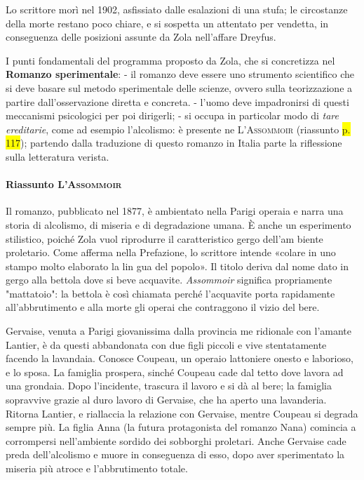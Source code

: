 \documentclass{book}
\newcommand{\pagine}[1]{\colorbox{yellow}{#1}}
\begin{document}
Lo scrittore morì nel 1902, asfissiato dalle esalazioni di una stufa; le
circostanze della morte restano poco chiare, e si sospetta un attentato
per vendetta, in conseguenza delle posizioni assunte da Zola nell'affare
Dreyfus.

I punti fondamentali del programma proposto da Zola, che si concretizza
nel \textbf{Romanzo sperimentale}: - il romanzo deve essere uno
strumento scientifico che si deve basare sul metodo sperimentale delle
scienze, ovvero sulla teorizzazione a partire dall'osservazione diretta
e concreta. - l'uomo deve impadronirsi di questi meccanismi psicologici
per poi dirigerli; - si occupa in particolar modo di \emph{tare
ereditarie}, come ad esempio l'alcolismo: è presente ne
\textsc{L'Assommoir} (riassunto \pagine{p. 117}); partendo dalla
traduzione di questo romanzo in Italia parte la riflessione sulla
letteratura verista.

\paragraph{Riassunto \textsc{L'Assommoir}} Il romanzo, pubblicato nel 1877, è ambientato nella Parigi operaia e narra una storia di alcolismo, di miseria e di degradazione umana. È anche un esperimento stilistico, poiché Zola vuol riprodurre il caratteristico gergo dell'am biente proletario. Come afferma nella Prefazione, lo scrittore intende «colare in uno stampo molto elaborato la lin gua del popolo». Il titolo deriva dal nome dato in gergo alla bettola dove si beve acquavite. \textit{Assommoir} significa propriamente "mattatoio": la bettola è così chiamata perché l'acquavite porta rapidamente all'abbrutimento e alla morte gli operai che contraggono il vizio del bere.

Gervaise, venuta a Parigi giovanissima dalla provincia me ridionale con l'amante Lantier, è da questi abbandonata con due figli piccoli e vive stentatamente facendo la lavandaia. Conosce Coupeau, un operaio lattoniere onesto e laborioso, e lo sposa. La famiglia prospera, sinché Coupeau cade dal tetto dove lavora ad una grondaia. Dopo l'incidente, trascura il lavoro e si dà al bere; la famiglia sopravvive grazie al duro lavoro di Gervaise, che ha aperto una lavanderia. Ritorna Lantier, e riallaccia la relazione con Gervaise, mentre Coupeau si degrada sempre più. La figlia Anna (la futura protagonista del romanzo Nana) comincia a corrompersi nell'ambiente sordido dei sobborghi proletari. Anche Gervaise cade preda dell'alcolismo e muore in conseguenza di esso, dopo aver sperimentato la miseria più atroce e l'abbrutimento totale.
 
\end{document}
